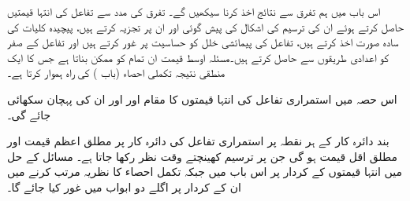 اس باب میں ہم تفرق سے نتائج اخذ کرنا سیکھیں گے۔  تفرق کی مدد سے تفاعل کی انتہا قیمتیں حاصل کرتے ہوئے ان کی ترسیم کی اشکال کی پیش گوئی  اور ان پر تجزیہ کرتے ہیں، پیچیدہ کلیات کی سادہ صورت اخذ کرتے ہیں، تفاعل کی پیمائشی خلل کو حساسیت پر غور کرتے ہیں اور تفاعل کے صفر کو اعدادی طریقوں سے حاصل کرتے ہیں۔مسئلہ اوسط قیمت ان تمام کو ممکن بناتا ہے جس کا ایک منطقی نتیجہ  تکملی احصاء (باب  ) کی راہ ہموار کرتا ہے۔  

اس حصہ میں استمراری تفاعل کی انتہا قیمتوں کا مقام اور اور ان کی پہچان سکھائی جائے گی۔

بند دائرہ کار کے ہر نقطہ پر استمراری تفاعل کی   دائرہ کار پر مطلق اعظم قیمت اور مطلق اقل قیمت ہو گی جن پر ترسیم کھینچتے وقت  نظر رکھا جاتا ہے۔ مسائل کے حل میں انتہا قیمتوں  کے کردار پر اس باب میں  جبکہ تکمل احصاء کا نظریہ مرتب کرنے میں ان کے کردار پر اگلے دو ابواب میں غور کیا جائے گا۔  

